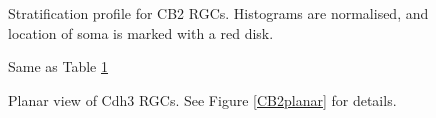 \documentclass{article}
\begin{document}
\begin{figure}
  \centering
  \label{CB2depth}
  \caption{Stratification profile for CB2 RGCs. Histograms are
    normalised, and location of soma is marked with a red disk.}
\end{figure}

\clearpage

\begin{figure}
  \centering
  \caption{Same as Table \ref{CB2depth}}
\end{figure}

\clearpage


\begin{figure}
  \centering
  \caption{Planar view of Cdh3 RGCs. See Figure \ref{CB2planar} for details.}
\end{figure}
\end{document}
